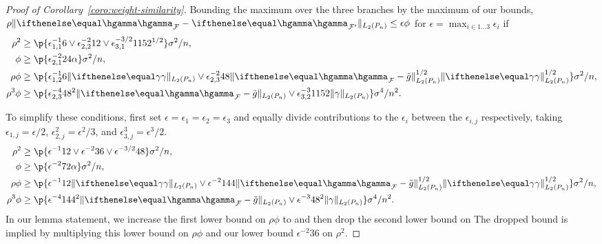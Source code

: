 \begin{proof}[Proof of Corollary~\ref{coro:weight-similarity}]
Bounding the maximum over the three branches by the maximum of our bounds,
$\rho\norm{\hriesz_{\F} - \hriesz_{\F'}}_{L_2(\Pn)} \le \epsilon \phi$
for $\epsilon=\max_{i \in 1 \ldots 3}\epsilon_{i}$ if 
\begin{align*}
\rho^2 &\ge \p{\epsilon_{1,1}^{-1}6 \vee \epsilon_{2,2}^{-2} 12 \vee \epsilon_{3,1}^{-3/2}1152^{1/2} } \sigma^2/n, \\
\phi      &\ge \p{\epsilon_{2,1}^{-2} 24\alpha } \sigma^2/n, \\
\rho \phi &\ge  \p{\epsilon_{1,2}^{-1} 6 \norm{\riesz}_{L_2(\Pn)} 
    			\vee \epsilon_{2,3}^{-2} 48\norm{\hriesz_{\F} - \gapprox}_{L_2(\Pn)}^{1/2} \norm{\riesz}_{L_2(\Pn)}^{1/2}} \sigma^2/n, \\
\rho^3 \phi &\ge \p{\epsilon_{2,3}^{-4} 48^2 \norm{\hriesz_{\F} - \gapprox}_{L_2(\Pn)} \vee \epsilon_{3,2}^{-3} 1152\norm{\gamma}_{L_2(\Pn)}} \sigma^4/n^2.
\end{align*}

To simplify these conditions, first set $\epsilon=\epsilon_1=\epsilon_2=\epsilon_3$ and equally divide
contributions to the $\epsilon_{i}$ between the $\epsilon_{i,j}$ respectively,
taking $\epsilon_{1,j}=\epsilon/2$, $\epsilon_{2,j}^2 = \epsilon^2/3$, and $\epsilon_{3,j}^3 = \epsilon^3/2$.
\begin{align*}
\rho^2 &\ge \p{\epsilon^{-1}12 \vee \epsilon^{-2} 36 \vee \epsilon^{-3/2}48 } \sigma^2/n, \\
\phi      &\ge \p{\epsilon^{-2} 72 \alpha } \sigma^2/n, \\
\rho \phi &\ge  \p{\epsilon^{-1} 12 \norm{\riesz}_{L_2(\Pn)} 
    			\vee \epsilon^{-2} 144\norm{\hriesz_{\F} - \gapprox}_{L_2(\Pn)}^{1/2} \norm{\riesz}_{L_2(\Pn)}^{1/2}} \sigma^2/n, \\
\rho^3 \phi &\ge \p{\epsilon^{-4} 144^2 \norm{\hriesz_{\F} - \gapprox}_{L_2(\Pn)} \vee \epsilon^{-3} 48^2 \norm{\gamma}_{L_2(\Pn)}} \sigma^4/n^2.
\end{align*}
In our lemma statement, we increase the first lower bound on $\rho \phi$ to 
and then drop the second lower bound on  The dropped bound is implied by multiplying 
this lower bound on $\rho \phi$ and our lower bound $\epsilon^{-2} 36$ on $\rho^2$.
\end{proof}


